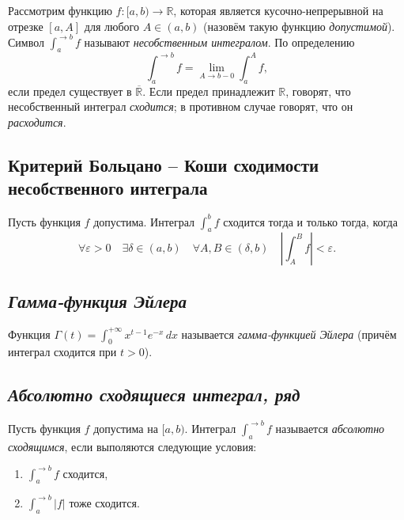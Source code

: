 \begin{definition}
	Рассмотрим функцию \(f \colon [a, b) \to \mathbb{R}\), которая является кусочно-непрерывной на отрезке \([a, A]\) для любого \(A \in (a, b)\) (назовём такую функцию \textit{допустимой}). Символ \(\int_a^{\to b} f\) называют \textit{несобственным интегралом}. По определению \[
	\int_a^{\to b} f = \lim_{A \to b - 0} \int_a^A f,
	\]
	если предел существует в \(\overline{\mathbb{R}}\). Если предел принадлежит \(\mathbb{R}\), говорят, что несобственный интеграл \textit{сходится}; в противном случае говорят, что он \textit{расходится}.
\end{definition}

\subsection{Критерий Больцано -- Коши сходимости несобственного интеграла}

\begin{theorem} \hypertarget{Критерий Больцано -- Коши сходимости несобственного интеграла}{}
	Пусть функция \(f\) допустима. Интеграл \(\int_a^b f\) сходится тогда и только тогда, когда \[
	\forall \varepsilon > 0 \quad \exists \delta \in (a, b) \quad \forall A, B \in (\delta, b) \quad \left|\int_A^B f \right| < \varepsilon.
	\]
\end{theorem}

\subsection{\itshape Гамма-функция Эйлера}

\begin{definition}
	Функция \(\displaystyle \Gamma(t) = \int_{0}^{+\infty} x^{t - 1} e^{-x} \, dx\) называется \textit{гамма-функцией Эйлера} (причём интеграл сходится при \(t > 0\)).
\end{definition}

\subsection{\itshape Абсолютно сходящиеся интеграл, ряд}

\begin{ndefinition}
	Пусть функция \(f\) допустима на \([a, b)\). Интеграл \(\int_{a}^{\to b} f\) называется \textit{абсолютно сходящимся}, если выполяются следующие условия:
	\begin{enumerate}
		\item \(\int_{a}^{\to b} f\) сходится,
		\item \(\int_{a}^{\to b} |f|\) тоже сходится.
	\end{enumerate}
\end{ndefinition}

